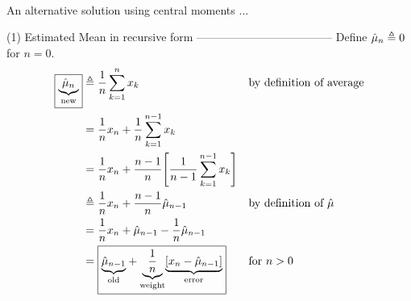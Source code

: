 $\newcommand{\ds}{\displaystyle}$
$\newcommand{\mean}{\mu}$
$\newcommand{\popvar}{\sigma^2}$
$\newcommand{\cmom}{\mu}$
$\newcommand{\meanest}{\hat{\mean}}$
$\newcommand{\seqn}[1]{\left\{#1\right\}}$
$\newcommand{\rvx}{x}$
$\newcommand{\xN}{N}$
$\newcommand{\eqd}{\triangleq}$
$\newcommand{\brp}[1]{{\left(#1\right)}}$
$\newcommand{\brs}[1]{{\left[#1\right]}}$
$\newcommand{\brl}[1]{{\left.#1\right|}}$
$\newcommand{\moment}{M}$
$\newcommand{\momest}{\hat{\moment}}$
$\newcommand{\meanest}{\hat{\mean}}$
$\newcommand{\cmomest}{\hat{\cmom}}$
$\newcommand{\varest}{\hat{\var}}$
$\newcommand{\popvarest}{\hat{\popvar}}$
$\newcommand{\samvarest}{\hat{s^2}}$
$\newcommand{\mcom}[2]{{\displaystyle\underbrace{\displaystyle#1}_{\text{#2}}}}$
$\newcommand{\indentx}{\ensuremath{\mbox{}\qquad}}$
$\newcommand{\bcoef}[2]{{#1\choose#2}}$

An alternative solution using central moments $\ldots$

(1) Estimated Mean in recursive form
------------------------------------
Define $\meanest_{n}\eqd 0$ for $n=0$.
\begin{align*}
  \boxed{\mcom{\meanest_{n}}{new}}
    &\eqd \frac{1}{n} \sum_{k=1}^{n} \rvx_k
    && \text{by definition of average}
  \\&= \frac{1}{n}\rvx_n + \frac{1}{n} \sum_{k=1}^{n-1} \rvx_k
  \\&= \frac{1}{n}\rvx_n + \frac{n-1}{n}\brs{\frac{1}{n-1} \sum_{k=1}^{n-1} \rvx_k }
  \\&\eqd \frac{1}{n}\rvx_n + \frac{n-1}{n}\meanest_{n-1}
    && \text{by definition of $\meanest$}
  \\&= \frac{1}{n}\rvx_n + \meanest_{n-1} - \frac{1}{n}\meanest_{n-1}
  \\&= \boxed{\mcom{\meanest_{n-1}}{old} + \mcom{\frac{1}{n}}{weight} \mcom{\brs{\rvx_n - \meanest_{n-1}}}{error}}
    && \text{for $n>0$}
\end{align*}

